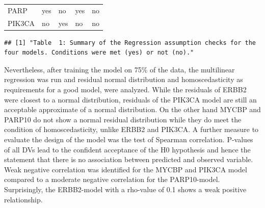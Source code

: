 \documentclass[]{article}
\begin{document}
\begin{longtable}[]{@{}lllll@{}}
\begin{minipage}[t]{0.10\columnwidth}
PARP\strut
\end{minipage} & \begin{minipage}[t]{0.19\columnwidth}\raggedright
yes\strut
\end{minipage} & \begin{minipage}[t]{0.21\columnwidth}\raggedright
no\strut
\end{minipage} & \begin{minipage}[t]{0.16\columnwidth}\raggedright
yes\strut
\end{minipage} & \begin{minipage}[t]{0.20\columnwidth}\raggedright
no\strut
\end{minipage}\tabularnewline
\begin{minipage}[t]{0.10\columnwidth}\raggedright
PIK3CA\strut
\end{minipage} & \begin{minipage}[t]{0.19\columnwidth}\raggedright
no\strut
\end{minipage} & \begin{minipage}[t]{0.21\columnwidth}\raggedright
yes\strut
\end{minipage} & \begin{minipage}[t]{0.16\columnwidth}\raggedright
no\strut
\end{minipage} & \begin{minipage}[t]{0.20\columnwidth}\raggedright
no\strut
\end{minipage}\tabularnewline
\bottomrule
\end{longtable}

\begin{verbatim}
## [1] "Table  1: Summary of the Regression assumption checks for the four models. Conditions were met (yes) or not (no)."
\end{verbatim}

Nevertheless, after training the model on 75\% of the data, the
multilinear regression was run and residual normal distribution and
homoscedasticity as requirements for a good model, were analyzed. While
the residuals of ERBB2 were closest to a normal distribution, residuals
of the PIK3CA model are still an acceptable approximate of a normal
distribution. On the other hand MYCBP and PARP10 do not show a normal
residual distribution while they do meet the condition of
homoscedasticity, unlike ERBB2 and PIK3CA. A further measure to evaluate
the design of the model was the test of Spearman correlation. P-values
of all DVs lead to the confident acceptance of the H0 hypothesis and
hence the statement that there is no association between predicted and
observed variable. Weak negative correlation was identified for the
MYCBP and PIK3CA model compared to a moderate negative correlation for
the PARP10-model. Surprisingly, the ERBB2-model with a rho-value of 0.1
shows a weak positive relationship.
\end{document}
